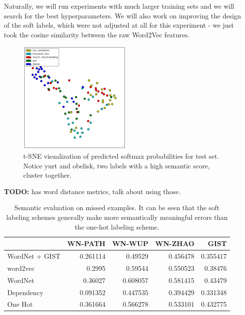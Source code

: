Naturally, we will run experiments with much larger training sets and we will
search for the best hyperparameters.
We will also work on improving the design of the soft labels, which were not
adjusted at all for this experiment - we just took the cosine similarity
between the raw Word2Vec features.


\begin{figure}[!tb]
  \centering
  \includegraphics[width=0.5\textwidth]{figs/tsne.png}
  \caption{
      t-SNE visualization of predicted softmax probabilities for test set.
      Notice yurt and obelisk, two labels with a high semantic score, cluster
      together.
  }
  \label{fig:tsne}
\end{figure}


\textbf{TODO:} \cite{budanitsky2006evaluating} has word distance metrics, talk
about using those.

\begin{table}[t]
    \centering
    \begin{tabular}{lrrrr}
         & WN-PATH & WN-WUP & WN-ZHAO & GIST\\
        \hline
        WordNet + GIST & 0.261114 & 0.49529 & 0.456478 & 0.355417\\
        word2vec & 0.2995 & 0.59544 & 0.550523 & 0.38476\\
        WordNet & 0.36027 & 0.608057 & 0.581415 & 0.43479\\
        Dependency & 0.091352 & 0.447535 & 0.394429 & 0.331348\\
        One Hot & 0.361664 & 0.566278 & 0.533101 & 0.432775\\
    \end{tabular}
  \label{tbl:semantic_misses}
  \caption{
      Semantic evaluation on missed examples. It can be seen that the soft
      labeling schemes generally make more semantically meaningful errors than
      the one-hot labeling scheme.
  }
\end{table}


%
